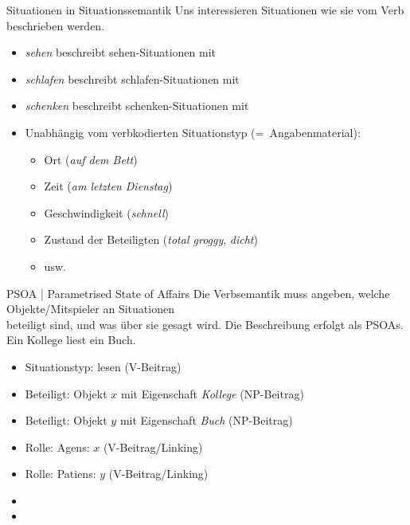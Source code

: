 \begin{frame}
  {Situationen in Situationssemantik}
  \onslide<+->
  \onslide<+->
  Uns interessieren \alert{Situationen wie sie vom Verb beschrieben werden}.\\
  \Zeile
  \begin{itemize}[<+->]
    \item \textit{sehen} beschreibt \alert{sehen-Situationen} mit 
    \item \textit{schlafen} beschreibt \alert{schlafen-Situationen} mit 
    \item \textit{schenken} beschreibt \alert{schenken-Situationen} mit 
      \Halbzeile
    \item Unabhängig vom verbkodierten Situationstyp (=~Angabenmaterial):
      \begin{itemize}[<+->]
        \item Ort (\textit{auf dem Bett})
        \item Zeit (\textit{am letzten Dienstag})
        \item Geschwindigkeit (\textit{schnell})
        \item Zustand der Beteiligten (\textit{total groggy}, \textit{dicht})
        \item usw.
      \end{itemize}
  \end{itemize}
\end{frame}

\begin{frame}
  {PSOA | Parametrised State of Affairs}
  \onslide<+->
  \onslide<+->
  Die Verbsemantik muss angeben, welche Objekte\slash Mitspieler an Situationen\\
  beteiligt sind, und was über sie gesagt wird. Die Beschreibung erfolgt als PSOAs.\\
  \onslide<+->
  \Zeile
  \alert{Ein Kollege liest ein Buch.}\\
  \Halbzeile
  \begin{itemize}[<+->]
    \item Situationstyp: \alert{lesen} (V-Beitrag)
    \item Beteiligt: \alert{Objekt $x$ mit Eigenschaft \textit{Kollege}} (NP-Beitrag)
    \item Beteiligt: \alert{Objekt $y$ mit Eigenschaft \textit{Buch}} (NP-Beitrag)
    \item Rolle: \alert{Agens: $x$} (V-Beitrag\slash Linking)
    \item Rolle: \alert{Patiens: $y$} (V-Beitrag\slash Linking)
      \Halbzeile
    \item {}
    \item {}
  \end{itemize}
\end{frame}

